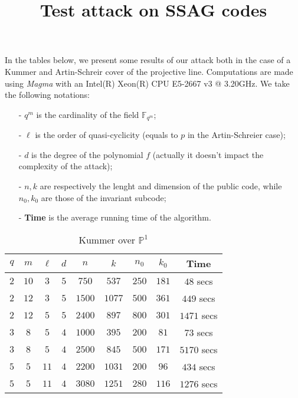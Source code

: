 \documentclass[a4paper]{article}
\title{Test attack on SSAG codes}
\author{}
\date{}
\begin{document}
\maketitle

In the tables below, we present some results of our attack both in the case of a Kummer and Artin-Schreir cover of the projective line. Computations are made using \textit{Magma} with an Intel(R) Xeon(R) CPU E5-2667 v3 @ 3.20GHz. We take the following notations:
\begin{enumerate}
    \item[-] $q^m$ is the cardinality of the field $\mathbb{F}_{q^m}$;
    \item[-] $\ell$ is the order of quasi-cyclicity (equals to $p$ in the Artin-Schreier case);
    \item[-] $d$ is the degree of the polynomial $f$ (actually it doesn't impact the complexity of the attack);
    \item[-] $n,k$ are respectively the lenght and dimension of the public code, while $n_0,k_0$ are those of the invariant subcode;
    \item[-] \textbf{Time} is the average running time of the algorithm.
\end{enumerate}

\begin{table}[h]
\begin{center}
\begin{tabular}{|c|c|c|c|c|c|c|c|c|}
    \hline
   $q$ & $m$ & $\ell$ & $d$ & $n$ & $k$ & $n_0$ & $k_0$ & \textbf{Time}  \\
    \hline
    $2$ & $10$ & $3$ & $5$ & $750$ & $537$ & $250$ & $181$ & $48$ secs \\
    \hline
    $2$ & $12$ & $3$ & $5$ & $1500$ & $1077$ & $500$ & $361$ & $449$ secs \\
    \hline
    $2$ & $12$ & $5$& $5$  & $2400$ & $897$ & $800$ & $301$ & $1471$ secs \\
     \hline
     $3$  & $8$ & $5$ & $4$ & $1000$ & $395$ & $200$ & $81$ & $73$ secs \\
     \hline
     $3$ & $8$ & $5$ & $4$ & $2500$ & $845$ & $500$ & $171$ & $5170$ secs \\
     \hline
      $5$ & $5$ & $11$ & $4$ & $2200$ & $1031$ & $200$ & $96$ & $434$ secs \\
     \hline
      $5$ & $5$ & $11$ & $4$ & $3080$ & $1251$ & $280$ & $116$ & $1276$ secs \\
     \hline
\end{tabular}
\caption{Kummer over $\mathbb{P}^1$}
\end{center}
\end{table}
\end{document}
